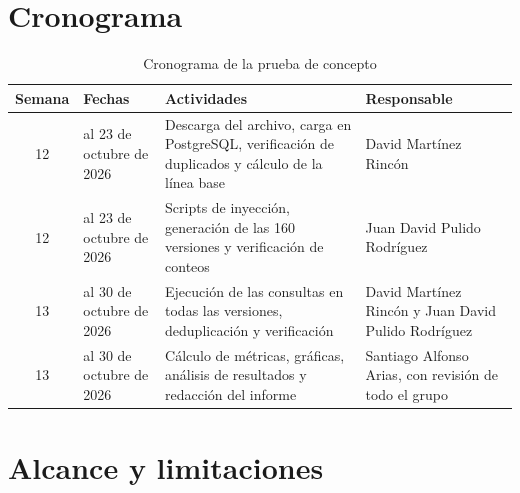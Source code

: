 \documentclass[11pt,openany,oneside,letterpaper]{book}
\begin{document}
\section{Cronograma}

\begin{table}[H]
\centering
\caption{Cronograma de la prueba de concepto}
\label{tab:crono_pdc}
\small
\begin{tabularx}{\textwidth}{c >{\raggedright\arraybackslash}p{2.6cm} X >{\raggedright\arraybackslash}p{3.6cm}}
\toprule
\textbf{Semana} & \textbf{Fechas} & \textbf{Actividades} & \textbf{Responsable} \\
\midrule
12 & 19 al 23 de octubre de 2026 & Descarga del archivo, carga en PostgreSQL, verificación de duplicados y cálculo de la línea base & David Martínez Rincón \\
12 & 19 al 23 de octubre de 2026 & Scripts de inyección, generación de las 160 versiones y verificación de conteos & Juan David Pulido Rodríguez \\
13 & 26 al 30 de octubre de 2026 & Ejecución de las consultas en todas las versiones, deduplicación y verificación & David Martínez Rincón y Juan David Pulido Rodríguez \\
13 & 26 al 30 de octubre de 2026 & Cálculo de métricas, gráficas, análisis de resultados y redacción del informe & Santiago Alfonso Arias, con revisión de todo el grupo \\
\bottomrule
\end{tabularx}
\end{table}

\section{Alcance y limitaciones}
\end{document}
